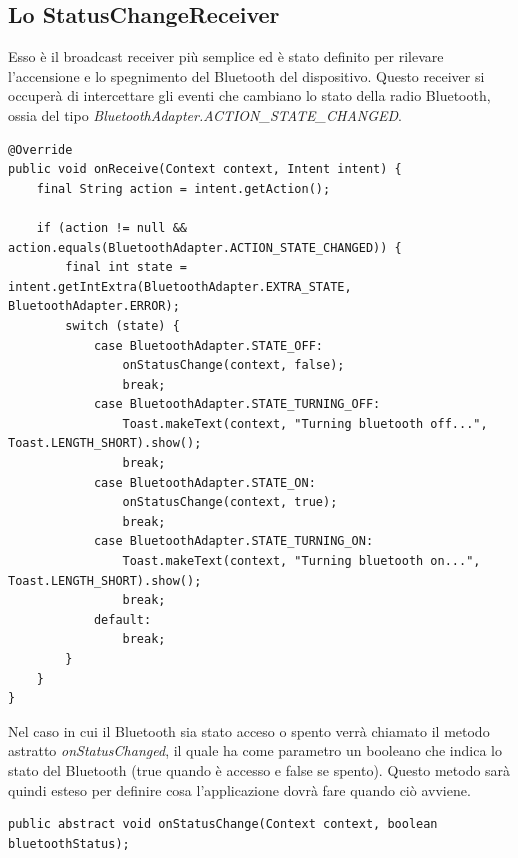 \subsection{Lo StatusChangeReceiver}
Esso è il broadcast receiver più semplice ed è stato definito per rilevare l'accensione e lo spegnimento del Bluetooth del dispositivo. Questo receiver si occuperà di intercettare gli eventi che cambiano lo stato della radio Bluetooth, ossia del tipo \textit{BluetoothAdapter.ACTION\_STATE\_CHANGED}.
\begin{verbatim}
@Override
public void onReceive(Context context, Intent intent) {
    final String action = intent.getAction();

    if (action != null && action.equals(BluetoothAdapter.ACTION_STATE_CHANGED)) {
        final int state = intent.getIntExtra(BluetoothAdapter.EXTRA_STATE, BluetoothAdapter.ERROR);
        switch (state) {
            case BluetoothAdapter.STATE_OFF:
                onStatusChange(context, false);
                break;
            case BluetoothAdapter.STATE_TURNING_OFF:
                Toast.makeText(context, "Turning bluetooth off...", Toast.LENGTH_SHORT).show();
                break;
            case BluetoothAdapter.STATE_ON:
                onStatusChange(context, true);
                break;
            case BluetoothAdapter.STATE_TURNING_ON:
                Toast.makeText(context, "Turning bluetooth on...", Toast.LENGTH_SHORT).show();
                break;
            default:
                break;
        }
    }
}
\end{verbatim}

Nel caso in cui il Bluetooth sia stato acceso o spento verrà chiamato il metodo astratto \textit{onStatusChanged}, il quale ha come parametro un booleano che indica lo stato del Bluetooth (true quando è accesso e false se spento). Questo metodo sarà quindi esteso per definire cosa l'applicazione dovrà fare quando ciò avviene.
\begin{verbatim}
public abstract void onStatusChange(Context context, boolean bluetoothStatus);
\end{verbatim}

